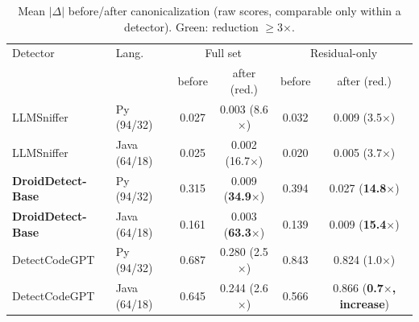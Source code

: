 \documentclass[sigconf,review,anonymous]{acmart}
\begin{document}
\begin{table}[t]
\centering
\caption{Mean $|\Delta|$ before/after canonicalization (raw scores, comparable only within a detector). Green: reduction $\ge$3$\times$.}
\label{tab:canon}
\begin{tabular*}{\textwidth}{@{}@{\extracolsep{\fill}}llcccc@{}}
\toprule
Detector & Lang. & \multicolumn{2}{c}{Full set} & \multicolumn{2}{c}{Residual-only} \\
 & & before & after (red.) & before & after (red.) \\
\midrule
LLMSniffer & Py (94/32) & 0.027 & \cellcolor{green!20}0.003 (8.6$\times$) & 0.032 & \cellcolor{green!20}0.009 (3.5$\times$) \\
LLMSniffer & Java (64/18) & 0.025 & \cellcolor{green!20}0.002 (16.7$\times$) & 0.020 & \cellcolor{green!20}0.005 (3.7$\times$) \\
\textbf{DroidDetect-Base} & Py (94/32) & 0.315 & \cellcolor{green!20}0.009 (\textbf{34.9$\times$}) & 0.394 & \cellcolor{green!20}0.027 (\textbf{14.8$\times$}) \\
\textbf{DroidDetect-Base} & Java (64/18) & 0.161 & \cellcolor{green!20}0.003 (\textbf{63.3$\times$}) & 0.139 & \cellcolor{green!20}0.009 (\textbf{15.4$\times$}) \\
DetectCodeGPT & Py (94/32) & 0.687 & 0.280 (2.5$\times$) & 0.843 & 0.824 (1.0$\times$) \\
DetectCodeGPT & Java (64/18) & 0.645 & 0.244 (2.6$\times$) & 0.566 & 0.866 (\textbf{0.7$\times$, increase}) \\
\bottomrule
\end{tabular*}
\end{table}
\end{document}
